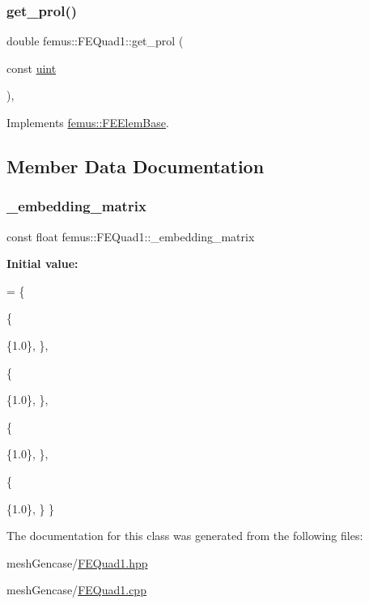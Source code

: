 \mbox{\label{classfemus_1_1_f_e_quad1_af157e342c76e4f964bfe669501a1752d}} 
\subsubsection{\texorpdfstring{get\+\_\+prol()}{get\_prol()}}
{\footnotesize\ttfamily double femus\+::\+F\+E\+Quad1\+::get\+\_\+prol (\begin{DoxyParamCaption}\item[{const \mbox{\hyperlink{_typedefs_8hpp_a91ad9478d81a7aaf2593e8d9c3d06a14}{uint}}}]{ }\end{DoxyParamCaption})\hspace{0.3cm}{\ttfamily [inline]}, {\ttfamily [virtual]}}



Implements \mbox{\hyperlink{classfemus_1_1_f_e_elem_base_ac82326cdc7cb02329c7be9547d56fad4}{femus\+::\+F\+E\+Elem\+Base}}.



\subsection{Member Data Documentation}
\mbox{\label{classfemus_1_1_f_e_quad1_ae517b96db0feaa741016d9361d807d2c}} 
\subsubsection{\texorpdfstring{\+\_\+embedding\+\_\+matrix}{\_embedding\_matrix}}
{\footnotesize\ttfamily const float femus\+::\+F\+E\+Quad1\+::\+\_\+embedding\+\_\+matrix\hspace{0.3cm}{\ttfamily [static]}}

{\bfseries Initial value\+:}
\begin{DoxyCode}
= \{
   
  
  \{
    
    \{1.0\}, 
  \},
  
  \{
    
    \{1.0\}, 
  \},
  
  \{
    
    \{1.0\}, 
  \},
  
  \{
    
    \{1.0\}, 
  \}
\}
\end{DoxyCode}


The documentation for this class was generated from the following files\+:\begin{DoxyCompactItemize}
\item 
mesh\+Gencase/\mbox{\hyperlink{_f_e_quad1_8hpp}{F\+E\+Quad1.\+hpp}}\item 
mesh\+Gencase/\mbox{\hyperlink{_f_e_quad1_8cpp}{F\+E\+Quad1.\+cpp}}\end{DoxyCompactItemize}
